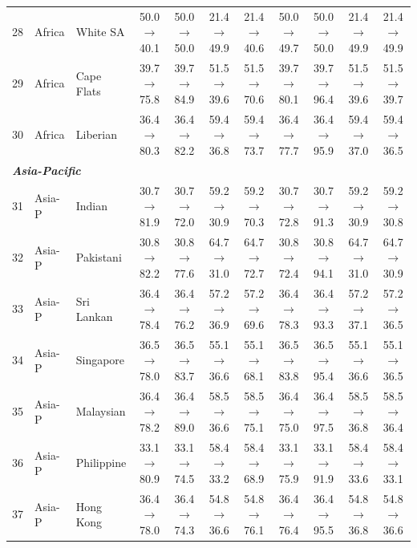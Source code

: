 \begin{table}[t]
{\begin{tabular}{rll c c c c c c c c}
28 & Africa & White SA & 50.0$\rightarrow$40.1 & 50.0$\rightarrow$50.0 & 21.4$\rightarrow$49.9 & 21.4$\rightarrow$40.6 & 50.0$\rightarrow$49.7 & 50.0$\rightarrow$50.0 & 21.4$\rightarrow$49.9 & 21.4$\rightarrow$49.9 \\
29 & Africa & Cape Flats & 39.7$\rightarrow$75.8 & 39.7$\rightarrow$84.9 & 51.5$\rightarrow$39.6 & 51.5$\rightarrow$70.6 & 39.7$\rightarrow$80.1 & 39.7$\rightarrow$96.4 & 51.5$\rightarrow$39.6 & 51.5$\rightarrow$39.7 \\
30 & Africa & Liberian & 36.4$\rightarrow$80.3 & 36.4$\rightarrow$82.2 & 59.4$\rightarrow$36.8 & 59.4$\rightarrow$73.7 & 36.4$\rightarrow$77.7 & 36.4$\rightarrow$95.9 & 59.4$\rightarrow$37.0 & 59.4$\rightarrow$36.5 \\
\midrule
\multicolumn{11}{l}{\textit{\textbf{Asia-Pacific}}} \\
31 & Asia-P & Indian & 30.7$\rightarrow$81.9 & 30.7$\rightarrow$72.0 & 59.2$\rightarrow$30.9 & 59.2$\rightarrow$70.3 & 30.7$\rightarrow$72.8 & 30.7$\rightarrow$91.3 & 59.2$\rightarrow$30.9 & 59.2$\rightarrow$30.8 \\
32 & Asia-P & Pakistani & 30.8$\rightarrow$82.2 & 30.8$\rightarrow$77.6 & 64.7$\rightarrow$31.0 & 64.7$\rightarrow$72.7 & 30.8$\rightarrow$72.4 & 30.8$\rightarrow$94.1 & 64.7$\rightarrow$31.0 & 64.7$\rightarrow$30.9 \\
33 & Asia-P & Sri Lankan & 36.4$\rightarrow$78.4 & 36.4$\rightarrow$76.2 & 57.2$\rightarrow$36.9 & 57.2$\rightarrow$69.6 & 36.4$\rightarrow$78.3 & 36.4$\rightarrow$93.3 & 57.2$\rightarrow$37.1 & 57.2$\rightarrow$36.5 \\
34 & Asia-P & Singapore & 36.5$\rightarrow$78.0 & 36.5$\rightarrow$83.7 & 55.1$\rightarrow$36.6 & 55.1$\rightarrow$68.1 & 36.5$\rightarrow$83.8 & 36.5$\rightarrow$95.4 & 55.1$\rightarrow$36.6 & 55.1$\rightarrow$36.5 \\
35 & Asia-P & Malaysian & 36.4$\rightarrow$78.2 & 36.4$\rightarrow$89.0 & 58.5$\rightarrow$36.6 & 58.5$\rightarrow$75.1 & 36.4$\rightarrow$75.0 & 36.4$\rightarrow$97.5 & 58.5$\rightarrow$36.8 & 58.5$\rightarrow$36.4 \\
36 & Asia-P & Philippine & 33.1$\rightarrow$80.9 & 33.1$\rightarrow$74.5 & 58.4$\rightarrow$33.2 & 58.4$\rightarrow$68.9 & 33.1$\rightarrow$75.9 & 33.1$\rightarrow$91.9 & 58.4$\rightarrow$33.6 & 58.4$\rightarrow$33.1 \\
37 & Asia-P & Hong Kong & 36.4$\rightarrow$78.0 & 36.4$\rightarrow$74.3 & 54.8$\rightarrow$36.6 & 54.8$\rightarrow$76.1 & 36.4$\rightarrow$76.4 & 36.4$\rightarrow$95.5 & 54.8$\rightarrow$36.8 & 54.8$\rightarrow$36.6 \\

\end{tabular}}
\end{table}
